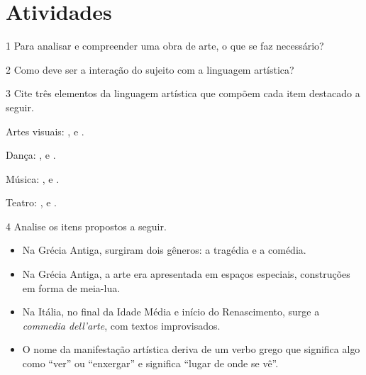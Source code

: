 \section{Atividades}

\num{1}  Para analisar e compreender uma obra de arte, o que se faz necessário?


\num{2} Como deve ser a interação do sujeito com a linguagem artística?


\num{3}  Cite três elementos da linguagem artística que compõem cada item destacado a seguir.

\begin{escolha}
\item
  Artes visuais: \preencher, \preencher e \preencher.


\item
  Dança: \preencher, \preencher e \preencher.


\item
  Música: \preencher, \preencher e \preencher.


\item
  Teatro: \preencher, \preencher e \preencher.

\end{escolha}

\num{4} Analise os itens propostos a seguir.

\begin{itemize}
  \item Na Grécia Antiga, surgiram dois gêneros: a tragédia e a comédia.
  \item Na Grécia Antiga, a arte era apresentada em espaços especiais,
construções em forma de meia-lua.
  \item Na Itália, no final da Idade Média e início do Renascimento, surge a
\textit{commedia dell'arte}, com textos improvisados.
  \item O nome da manifestação artística deriva de um verbo grego que significa algo como ``ver'' ou ``enxergar'' e significa ``lugar de onde se vê''.
\end{itemize}

